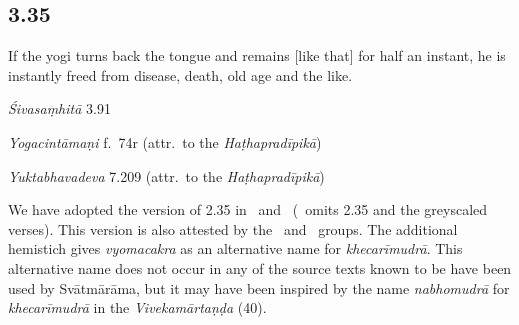 \begin{ekdosis}

\subsection*{3.35}
\begin{translation}[hp03_035]
If the yogi turns back the tongue and remains [like that] for half an instant, he is instantly freed from disease, death, old age and the like.
\end{translation}

\begin{sources}[hp03_035]
\emph{Śivasaṃhitā} 3.91
\begin{versinnote}
\end{versinnote}
\end{sources}

\begin{testimonia}[hp03_035]
\emph{Yogacintāmaṇi} f.~74r (attr.~to the \emph{Haṭhapradīpikā})
\begin{versinnote}
\end{versinnote}

\emph{Yuktabhavadeva} 7.209 (attr.~to the \emph{Haṭhapradīpikā})
\begin{versinnote}
\end{versinnote}
\end{testimonia}

\begin{philcomm}[hp03_035]
We have adopted the version of 2.35 in \alphaTwo\ and \alphaThree\ (\alphaOne\ omits 2.35 and the greyscaled verses). This version is also attested by the \textgamma\ and \texteta\ groups. The additional hemistich gives \emph{vyomacakra} as an alternative name for \emph{khecarīmudrā}. This alternative name does not occur in any of the source texts known to be have been used by Svātmārāma, but it may have been inspired by the name \emph{nabhomudrā} for \emph{khecarīmudrā} in the \emph{Vivekamārtaṇḍa} (40).   
\end{philcomm}


\end{ekdosis}
